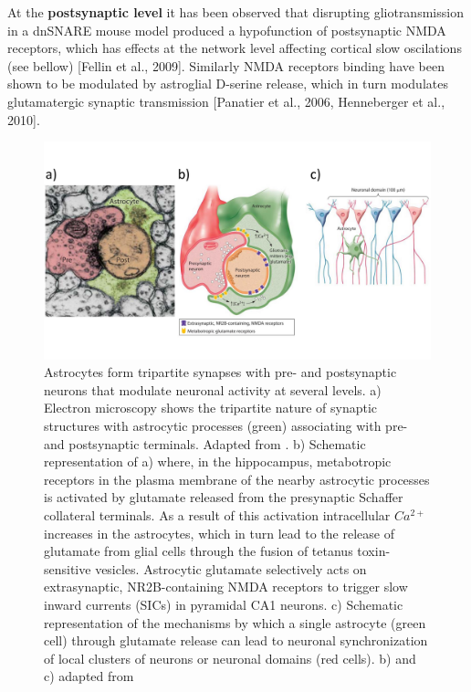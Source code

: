 At the \textbf{postsynaptic level} it has been observed that disrupting gliotransmission in a dnSNARE mouse model produced a hypofunction of postsynaptic NMDA receptors, which has effects at the network level affecting cortical slow oscilations (see bellow) [Fellin et al., 2009].
Similarly NMDA receptors binding have been shown to be modulated by astroglial D-serine release, which in turn modulates glutamatergic synaptic transmission [Panatier et al., 2006, Henneberger et al., 2010].
\begin{figure}
    \centering
    \includegraphics[trim={0 60 0 70},clip,width=\textwidth]{Figures/Chapter1/intro_fig_astro_neuron_modulation.pdf}
    \caption{Astrocytes form tripartite synapses with pre- and postsynaptic neurons that modulate neuronal activity at several levels. a) Electron microscopy shows the tripartite nature of synaptic structures with astrocytic processes (green) associating with pre- and postsynaptic terminals. Adapted from \cite{mariotti2018}. b) Schematic representation of a) where, in the hippocampus, metabotropic receptors in the plasma membrane of the nearby astrocytic processes is activated by glutamate released from the presynaptic Schaffer collateral terminals. As a result of this activation intracellular $Ca^{2+}$ increases in the astrocytes, which in turn lead to the release of glutamate from glial cells through the fusion of tetanus toxin-sensitive vesicles. Astrocytic glutamate selectively acts on extrasynaptic, NR2B-containing NMDA receptors to trigger slow inward currents (SICs) in pyramidal CA1 neurons. c) Schematic representation of the mechanisms by which a single astrocyte (green cell) through glutamate release can lead to neuronal synchronization of local clusters of neurons or neuronal domains (red cells). b) and c) adapted from \cite{fellin2006}}
    \label{fig:chap1:astro_neuro_modulation}
\end{figure}
